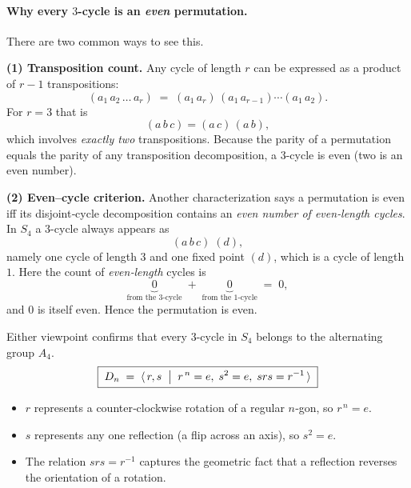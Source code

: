 \documentclass[12pt]{article}
\theoremstyle{definition} %
\theoremstyle{plain} %
\begin{document}
  \paragraph{Why every \(3\)-cycle is an \emph{even} permutation.}

There are two common ways to see this.

\medskip
\textbf{(1)  Transposition count.}
Any cycle of length \(r\) can be expressed as a product of \(r-1\)
transpositions:
\[
  (a_{1}\,a_{2}\,\dots\,a_{r})
  \;=\;
  (a_{1}\,a_{r})\,(a_{1}\,a_{r-1})\cdots(a_{1}\,a_{2}).
\]
For \(r=3\) that is  
\[
  (a\,b\,c)=(a\,c)\,(a\,b),
\]
which involves \emph{exactly two} transpositions.
Because the parity of a permutation equals the parity of any transposition
decomposition, a \(3\)-cycle is even (two is an even number).

\medskip
\textbf{(2)  Even–cycle criterion.}
Another characterization says a permutation is even
iff its disjoint‑cycle decomposition contains an \emph{even number of
even‑length cycles}.
In \(S_{4}\) a \(3\)-cycle always appears as
\[
  (a\,b\,c)\;(d),
\]
namely one cycle of length \(3\) and one fixed point \((d)\), which is a cycle
of length \(1\).
Here the count of \emph{even‑length} cycles is
\[
  \underbrace{0}_{\text{from the 3‑cycle}}
  \;+\;
  \underbrace{0}_{\text{from the 1‑cycle}}
  \;=\;0,
\]
and \(0\) is itself even.
Hence the permutation is even.

\medskip
Either viewpoint confirms that every \(3\)-cycle in \(S_{4}\)
belongs to the alternating group \(A_{4}\).
\[
\boxed{\;
  D_{n}\;=\;
  \langle\, r,s \;\bigm|\; r^{\,n}=e,\; s^{2}=e,\; srs = r^{-1}\,\rangle
\;}
\]

\begin{itemize}
  \item $r$ represents a counter‑clockwise rotation of a regular $n$‑gon,
        so $r^{\,n}=e$.
  \item $s$ represents any one reflection (a flip across an axis),
        so $s^{2}=e$.
  \item The relation $srs=r^{-1}$ captures the geometric fact that a
        reflection reverses the orientation of a rotation.
\end{itemize}
\end{document}
